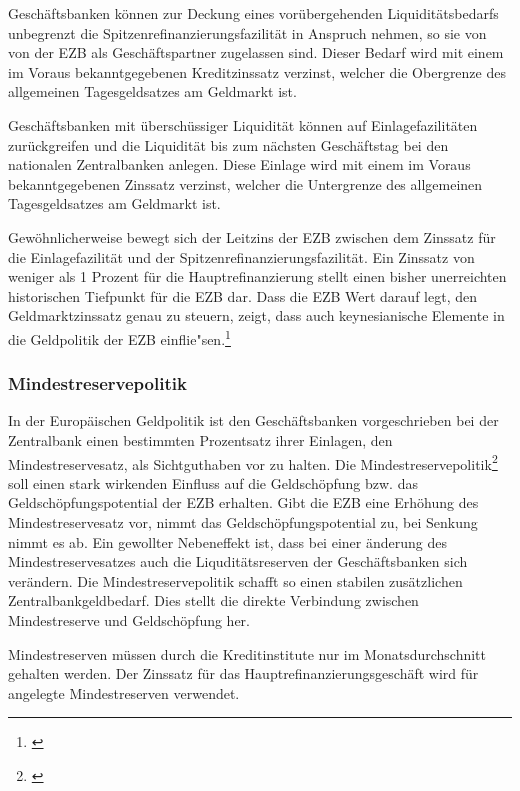 \documentclass[
        onecolumn,
        a4paper,
        abstracton,
        parskip=half
        ,final
        ]{scrartcl}
\begin{document}
Gesch{\"a}ftsbanken k{\"o}nnen zur Deckung eines vor{\"u}bergehenden Liquidit{\"a}tsbedarfs unbegrenzt die Spitzenrefinanzierungsfazilit{\"a}t in Anspruch nehmen, so sie von von der EZB als Gesch{\"a}ftspartner zugelassen sind. Dieser Bedarf wird mit einem im Voraus bekanntgegebenen Kreditzinssatz verzinst, welcher die Obergrenze des allgemeinen Tagesgeldsatzes am Geldmarkt ist.

Gesch{\"a}ftsbanken mit {\"u}bersch{\"u}ssiger Liquidit{\"a}t  k{\"o}nnen auf Einlagefazilit{\"a}ten zur{\"u}ckgreifen und die Liquidit{\"a}t bis zum n{\"a}chsten Gesch{\"a}ftstag bei den nationalen Zentralbanken anlegen. Diese Einlage wird mit einem im Voraus bekanntgegebenen Zinssatz verzinst, welcher die Untergrenze des allgemeinen Tagesgeldsatzes am Geldmarkt ist.

Gew{\"o}hnlicherweise bewegt sich der Leitzins der EZB zwischen dem Zinssatz f{\"u}r die Einlagefazilit{\"a}t und der Spitzenrefinanzierungsfazilit{\"a}t. Ein Zinssatz von weniger als 1 Prozent f{\"u}r die Hauptrefinanzierung stellt einen bisher unerreichten historischen Tiefpunkt f{\"u}r die EZB dar.
Dass die EZB Wert darauf legt, den Geldmarktzinssatz genau zu steuern, zeigt, dass auch keynesianische Elemente in die Geldpolitik der EZB einflie{"s}en.\footnote[49]{\citep*[vgl.][S.562f]{Basseler2010}}

\subsubsection{Mindestreservepolitik}   %
In der Europ{\"a}ischen Geldpolitik ist den Gesch{\"a}ftsbanken vorgeschrieben bei der Zentralbank einen bestimmten Prozentsatz ihrer Einlagen, den Mindestreservesatz, als Sichtguthaben vor zu halten. Die Mindestreservepolitik\footnote[50]{\citep*[vgl.][S.562f]{Basseler2010}} soll einen stark wirkenden Einfluss auf die Geldsch{\"o}pfung bzw. das Geldsch{\"o}pfungspotential der EZB erhalten. Gibt die EZB eine Erh{\"o}hung des Mindestreservesatz vor, nimmt das Geldsch{\"o}pfungspotential zu, bei Senkung nimmt es ab.
Ein gewollter Nebeneffekt ist, dass bei einer {\"a}nderung des Mindestreservesatzes auch die Liqudit{\"a}tsreserven der Gesch{\"a}ftsbanken sich ver{\"a}ndern.
Die Mindestreservepolitik schafft so einen stabilen zus{\"a}tzlichen Zentralbankgeldbedarf. Dies stellt die direkte Verbindung zwischen Mindestreserve und Geldsch{\"o}pfung her.

Mindestreserven m{\"u}ssen durch die Kreditinstitute nur im Monatsdurchschnitt gehalten werden. Der Zinssatz f{\"u}r das Hauptrefinanzierungsgesch{\"a}ft wird f{\"u}r angelegte Mindestreserven verwendet.
\end{document}

